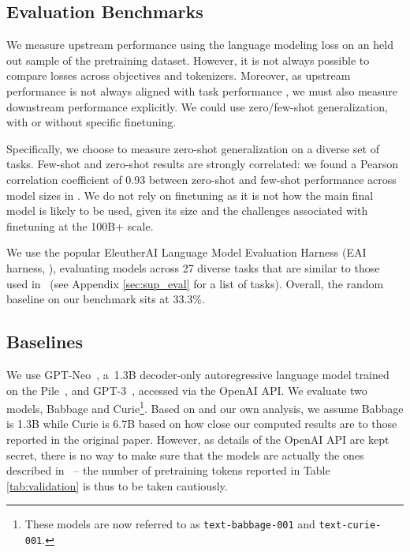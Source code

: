 \subsection{Evaluation Benchmarks} 
We measure upstream performance using the language modeling loss on an held out sample of the pretraining dataset. However, it is not always possible to compare losses across objectives and tokenizers. Moreover, as upstream performance is not always aligned with task performance \cite{Tay2021ScaleEI}, we must also measure downstream performance explicitly. We could use zero/few-shot generalization, with or without specific finetuning. 

Specifically, we choose to measure zero-shot generalization on a diverse set of tasks. Few-shot and zero-shot results are strongly correlated: we found a Pearson correlation coefficient of 0.93 between zero-shot and few-shot performance across model sizes in \citet{brown2020gpt3}. We do not rely on finetuning as it is not how the main final model is likely to be used, given its size and the challenges associated with finetuning at the 100B+ scale. 

We use the popular EleutherAI Language Model Evaluation Harness (EAI harness, \citet{eval-harness}), evaluating models across 27 diverse tasks that are similar to those used in~\citet{brown2020gpt3} (see Appendix \ref{sec:sup_eval} for a list of tasks). Overall, the random baseline on our benchmark sits at 33.3\%. 

\subsection{Baselines} 
We use GPT-Neo~\cite{gpt-neo}, a~1.3B decoder-only autoregressive language model trained on the Pile~\cite{gao2020pile}, and GPT-3~\cite{brown2020gpt3}, accessed via the OpenAI API. We evaluate two models, Babbage and Curie\footnote{These models are now referred to as \texttt{text-babbage-001} and \texttt{text-curie-001}.}. Based on \citet{gaosize} and our own analysis, we assume  
Babbage is 1.3B while Curie is 6.7B based on how close our computed results are to those reported in the original paper. However, as details of the OpenAI API are kept secret, there is no way to make sure that the models are actually the ones described in~\citet{brown2020gpt3} -- the number of pretraining tokens reported in Table \ref{tab:validation} is thus to be taken cautiously.
